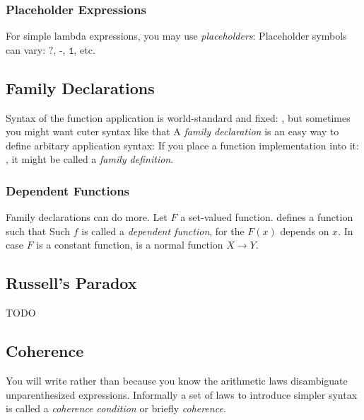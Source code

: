 \subsubsection{Placeholder Expressions}

For simple lambda expressions, you may use \textit{placeholders}:
Placeholder symbols can vary: $\texttt{?}$, $\texttt{-}$, $\texttt{1}$, etc.


\subsection{Family Declarations}

Syntax of the function application is world-standard and fixed:
, but sometimes you might want cuter syntax like that
A \textit{family declaration} is an easy way to define arbitary application syntax:
If you place a function implementation into it:
, it might be called a \textit{family definition}.


\subsubsection{Dependent Functions}

Family declarations can do more. Let $F$ a set-valued function.
defines a function
such that
Such $f$ is called a \textit{dependent function}, for the $F(x)$ depends on $x$. %
In case $F$ is a constant function,
is a normal function $X \to Y$. 

\subsection{Russell's Paradox}
TODO

\subsection{Coherence}

You will write
rather than
because you know the arithmetic laws
disambiguate unparenthesized expressions.
Informally a set of laws to introduce simpler syntax is called a \textit{coherence condition} or briefly \textit{coherence}.

